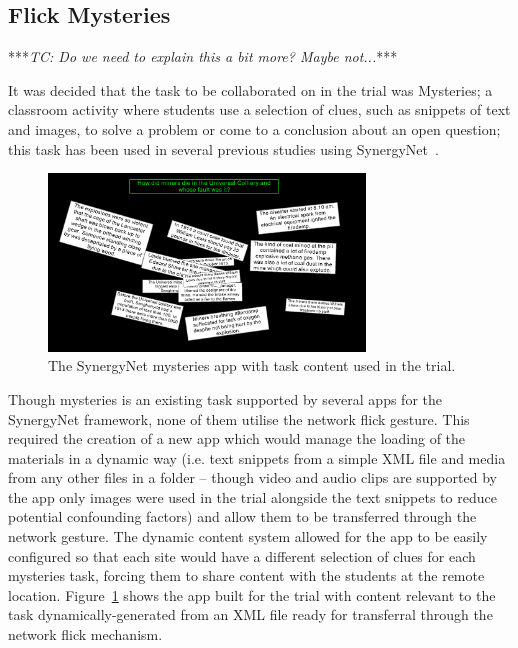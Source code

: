 \documentclass[a4paper,11pt]{article}
\begin{document}
\subsection{Flick Mysteries}

***{\emph{TC: Do we need to explain this a bit more? Maybe not...}}***

It was decided that the task to be collaborated on in the trial was Mysteries; a classroom activity where students use a selection of clues, such as snippets of text and images, to solve a problem or come to a conclusion about an open question; this task has been used in several previous studies using SynergyNet~\cite{mercier:2013,mercier:2014,mercier:2015}.

\begin{figure}[h]
 \centering
   \includegraphics[width=0.75\textwidth]{figures/flickmysteryexample.png}
   \caption{The SynergyNet mysteries app with task content used in the trial.}
   \label{fig:FlickMysteryExample}
\end{figure}

Though mysteries is an existing task supported by several apps for the SynergyNet framework, none of them utilise the network flick gesture.
This required the creation of a new app which would manage the loading of the materials in a dynamic way (i.e. text snippets from a simple XML file and media from any other files in a folder -- though video and audio clips are supported by the app only images were used in the trial alongside the text snippets to reduce potential confounding factors) and allow them to be transferred through the network gesture.
The dynamic content system allowed for the app to be easily configured so that each site would have a different selection of clues for each mysteries task, forcing them to share content with the students at the remote location.
Figure~\ref{fig:FlickMysteryExample} shows the app built for the trial with content relevant to the task dynamically-generated from an XML file ready for transferral through the network flick mechanism.
\end{document}
